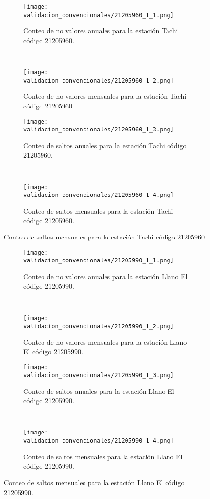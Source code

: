 \begin{figure}[H]\ContinuedFloat
\centering
	\begin{subfigure}[normla]{0.4\textwidth}
	\texttt{[image: validacion\_convencionales/21205960\_1\_1.png]}
		\caption{Conteo de no valores anuales para la estación Tachi código 21205960.}
		\label{subfig:a1}
		\end{subfigure}
		~
    \begin{subfigure}[normla]{0.4\textwidth}
	\texttt{[image: validacion\_convencionales/21205960\_1\_2.png]}
		\caption{Conteo de no valores mensuales para la estación Tachi código 21205960.}
		\label{subfig:a2}
		\end{subfigure}
		
    \begin{subfigure}[normla]{0.4\textwidth}
	\texttt{[image: validacion\_convencionales/21205960\_1\_3.png]}
		\caption{Conteo de saltos anuales para la estación Tachi código 21205960.}
		\label{subfig:a1}
		\end{subfigure}
		~
    \begin{subfigure}[normla]{0.4\textwidth}
	\texttt{[image: validacion\_convencionales/21205960\_1\_4.png]}
		\caption{Conteo de saltos mensuales para la estación Tachi código 21205960.}
		\label{subfig:a2}
		\end{subfigure}

	
\end{figure}
           
\begin{figure}[H]\ContinuedFloat
\centering
	\begin{subfigure}[normla]{0.4\textwidth}
	\texttt{[image: validacion\_convencionales/21205990\_1\_1.png]}
		\caption{Conteo de no valores anuales para la estación Llano El código 21205990.}
		\label{subfig:a1}
		\end{subfigure}
		~
    \begin{subfigure}[normla]{0.4\textwidth}
	\texttt{[image: validacion\_convencionales/21205990\_1\_2.png]}
		\caption{Conteo de no valores mensuales para la estación Llano El código 21205990.}
		\label{subfig:a2}
		\end{subfigure}
		
    \begin{subfigure}[normla]{0.4\textwidth}
	\texttt{[image: validacion\_convencionales/21205990\_1\_3.png]}
		\caption{Conteo de saltos anuales para la estación Llano El código 21205990.}
		\label{subfig:a1}
		\end{subfigure}
		~
    \begin{subfigure}[normla]{0.4\textwidth}
	\texttt{[image: validacion\_convencionales/21205990\_1\_4.png]}
		\caption{Conteo de saltos mensuales para la estación Llano El código 21205990.}
		\label{subfig:a2}
		\end{subfigure}

	
\end{figure}
           

